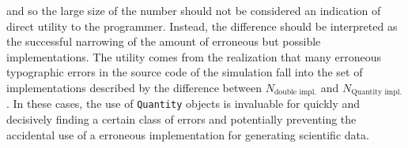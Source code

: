 \documentclass[reprint]{revtex4-1}
\begin{document}
and so the large size of the number should not be considered an indication of direct utility to the programmer.
Instead, the difference should be interpreted as the successful narrowing of the amount of erroneous but possible
implementations. The utility comes from the realization that many erroneous typographic errors in the source
code of the simulation fall into the set of implementations described by the difference between
$N_{\text{double impl.}}$ and $N_{\text{Quantity impl.}}$. In these cases, the use of \verb|Quantity| objects is invaluable for
quickly and decisively finding a certain class of errors and potentially preventing the accidental use of a
erroneous implementation for generating scientific data.
\end{document}
